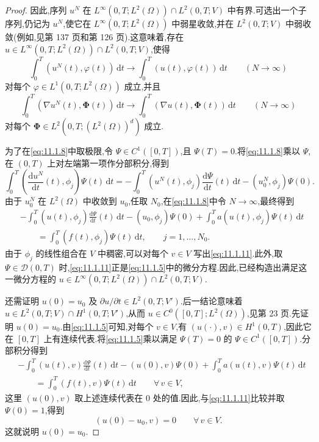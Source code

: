 \begin{proof}
因此,序列 \(u^N\) 在 \(L^\infty(0,T;L^2(\Omega))\cap L^2(0,T;V)\) 中有界.可选出一个子序列,仍记为 \(u^N\),使它在 \(L^\infty(0,T;L^2(\Omega))\) 中弱星收敛,并在 \(L^2(0,T;V)\) 中弱收敛(例如,见第 137 页和第 126 页).这意味着,存在 \(u\in L^\infty(0,T;L^2(\Omega))\cap L^2(0,T;V)\),使得
\[
  \int_0^T(u^N(t),\varphi(t))\,\mathrm dt
      \longrightarrow\int_0^T(u(t),\varphi(t))\,\mathrm dt\qquad(N\to\infty)
\]
对每个 \(\varphi\in L^1(0,T;L^2(\Omega))\) 成立,并且
\[
  \int_0^T(\nabla u^N(t),\boldsymbol{\Phi}(t))\,\mathrm dt
     \longrightarrow\int_0^T(\nabla u(t),\boldsymbol{\Phi}(t))\,\mathrm dt
        \qquad(N\to\infty)
\]
对每个 \(\boldsymbol{\Phi}\in L^2(0,T;(L^2(\Omega))^d)\) 成立.

为了在\eqref{eq:11.1.8}中取极限,令 \(\Psi\in C^1([0,T])\),且 \(\Psi(T)=0\).将\eqref{eq:11.1.8}乘以 \(\Psi\),在 \((0,T)\) 上对左端第一项作分部积分,得到
\[
  \int_0^T\left(\frac{\mathrm du^N}{\mathrm dt}(t),\phi_j\right)\Psi(t)\,\mathrm dt
    =-\int_0^T(u^N(t),\phi_j)\frac{\mathrm d\Psi}{\mathrm dt}(t)\,\mathrm dt
       -(u_0^N,\phi_j)\Psi(0).
\]
由于 \(u_0^N\) 在 \(L^2(\Omega)\) 中收敛到 \(u_0\),任取 \(N_0\),在\eqref{eq:11.1.8}中令 \(N\to\infty\),最终得到
\begin{equation}\label{eq:11.1.11}
  \begin{aligned}
    &-\int_0^T(u(t),\phi_j)\frac{\mathrm d\Psi}{\mathrm dt}(t)\,\mathrm dt
        -(u_0,\phi_j)\Psi(0)+\int_0^T a(u(t),\phi_j)\Psi(t)\,\mathrm dt\\
    &\qquad=\int_0^T(f(t),\phi_j)\Psi(t)\,\mathrm dt,\qquad j=1,\ldots,N_0.
  \end{aligned}
\end{equation}
由于 \(\phi_j\) 的线性组合在 \(V\) 中稠密,可以对每个 \(v\in V\) 写出\eqref{eq:11.1.11}.此外,取 \(\Psi\in\mathcal D(0,T)\) 时,\eqref{eq:11.1.11}正是\eqref{eq:11.1.5}中的微分方程.因此,已经构造出满足这一微分方程的 \(u\in L^\infty(0,T;L^2(\Omega))\cap L^2(0,T;V)\).

还需证明 \(u(0)=u_0\) 及 \(\partial u/\partial t\in L^2(0,T;V')\).后一结论意味着 \(u\in L^2(0,T;V)\cap H^1(0,T;V')\),从而 \(u\in C^0([0,T];L^2(\Omega))\),见第 23 页.先证明 \(u(0)=u_0\).由\eqref{eq:11.1.5}可知,对每个 \(v\in V\),有 \((u(\cdot),v)\in H^1(0,T)\),因此它在 \([0,T]\) 上有连续代表.将\eqref{eq:11.1.5}乘以满足 \(\Psi(T)=0\) 的 \(\Psi\in C^1([0,T])\).分部积分得到
\[
  \begin{aligned}
    &-\int_0^T(u(t),v)\frac{\mathrm d\Psi}{\mathrm dt}(t)\,\mathrm dt
       -(u(0),v)\Psi(0)+\int_0^T a(u(t),v)\Psi(t)\,\mathrm dt\\
    &\qquad=\int_0^T(f(t),v)\Psi(t)\,\mathrm dt\qquad\forall\,v\in V,
  \end{aligned}
\]
这里 \((u(0),v)\) 取上述连续代表在 \(0\) 处的值.因此,与\eqref{eq:11.1.11}比较并取 \(\Psi(0)=1\),得到
\[
  (u(0)-u_0,v)=0\qquad\forall\,v\in V.
\]
这就说明 \(u(0)=u_0\).


\end{proof}
